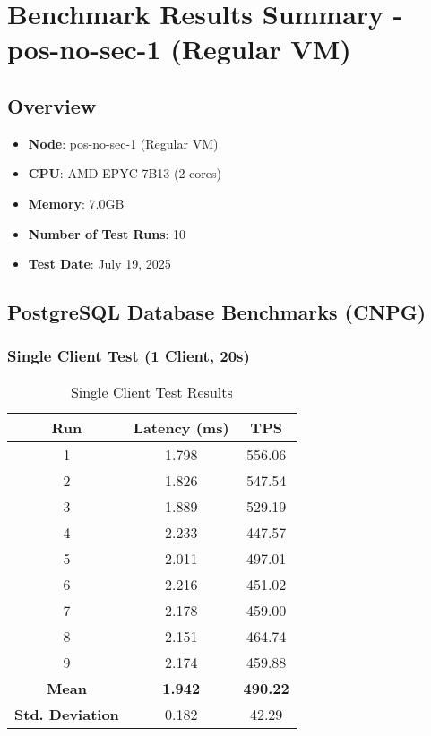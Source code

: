 \chapter{Benchmark Results Summary - pos-no-sec-1 (Regular VM)}

\section{Overview}
\begin{itemize}
    \item \textbf{Node}: pos-no-sec-1 (Regular VM)
    \item \textbf{CPU}: AMD EPYC 7B13 (2 cores)
    \item \textbf{Memory}: 7.0GB
    \item \textbf{Number of Test Runs}: 10
    \item \textbf{Test Date}: July 19, 2025
\end{itemize}

\section{PostgreSQL Database Benchmarks (CNPG)}

\subsection{Single Client Test (1 Client, 20s)}
\begin{table}[H]
\centering
\begin{tabular}{|c|c|c|}
\hline
\textbf{Run} & \textbf{Latency (ms)} & \textbf{TPS} \\
\hline
1 & 1.798 & 556.06 \\
2 & 1.826 & 547.54 \\
3 & 1.889 & 529.19 \\
4 & 2.233 & 447.57 \\
5 & 2.011 & 497.01 \\
6 & 2.216 & 451.02 \\
7 & 2.178 & 459.00 \\
8 & 2.151 & 464.74 \\
9 & 2.174 & 459.88 \\
\hline
\textbf{Mean} & \textbf{1.942} & \textbf{490.22} \\
\textbf{Std. Deviation} & 0.182 & 42.29 \\
\hline
\end{tabular}
\caption{Single Client Test Results}
\end{table}

